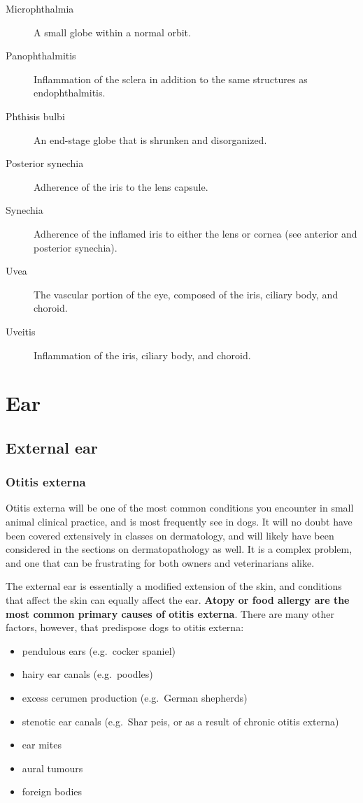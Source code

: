 \documentclass[
  openany]{article}
\providecommand{\tightlist}{%
  \setlength{\itemsep}{0pt}\setlength{\parskip}{0pt}}
\begin{document}
\begin{description}
\item[Microphthalmia]
A small globe within a normal orbit.
\item[Panophthalmitis]
Inflammation of the sclera in addition to the same structures as endophthalmitis.
\item[Phthisis bulbi]
An end-stage globe that is shrunken and disorganized.
\item[Posterior synechia]
Adherence of the iris to the lens capsule.
\item[Synechia]
Adherence of the inflamed iris to either the lens or cornea (see anterior and posterior synechia).
\item[Uvea]
The vascular portion of the eye, composed of the iris, ciliary body, and choroid.
\item[Uveitis]
Inflammation of the iris, ciliary body, and choroid.
\end{description}

\hypertarget{ear}{%
\section{Ear}\label{ear}}

\hypertarget{external-ear}{%
\subsection{External ear}\label{external-ear}}

\hypertarget{otitis-externa}{%
\subsubsection{Otitis externa}\label{otitis-externa}}

Otitis externa will be one of the most common conditions you encounter in small animal clinical practice, and is most frequently see in dogs. It will no doubt have been covered extensively in classes on dermatology, and will likely have been considered in the sections on dermatopathology as well. It is a complex problem, and one that can be frustrating for both owners and veterinarians alike.

The external ear is essentially a modified extension of the skin, and conditions that affect the skin can equally affect the ear. \textbf{Atopy or food allergy are the most common primary causes of otitis externa}. There are many other factors, however, that predispose dogs to otitis externa:

\begin{itemize}
\tightlist
\item
  pendulous ears (e.g.~cocker spaniel)
\item
  hairy ear canals (e.g.~poodles)
\item
  excess cerumen production (e.g.~German shepherds)
\item
  stenotic ear canals (e.g.~Shar peis, or as a result of chronic otitis externa)
\item
  ear mites
\item
  aural tumours
\item
  foreign bodies
\end{itemize}
\end{document}
